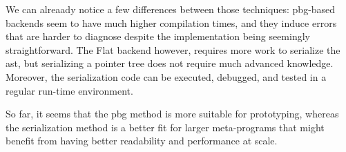 \documentclass[../main]{subfiles}
\begin{document}
We can alreaady notice a few differences between those techniques:
\gls{pbg}-based backends seem to have much higher compilation times,
and they induce errors that are harder to diagnose despite the implementation
being seemingly straightforward.
The Flat backend however, requires more work to serialize the \gls{ast},
but serializing a pointer tree does not require much advanced \cpp knowledge.
Moreover, the serialization code can be executed, debugged, and tested in a
regular run-time environment.

So far, it seems that the \gls{pbg} method is more suitable for prototyping,
whereas the serialization method is a better fit for larger meta-programs that
might benefit from having better readability and performance at scale.
\end{document}
